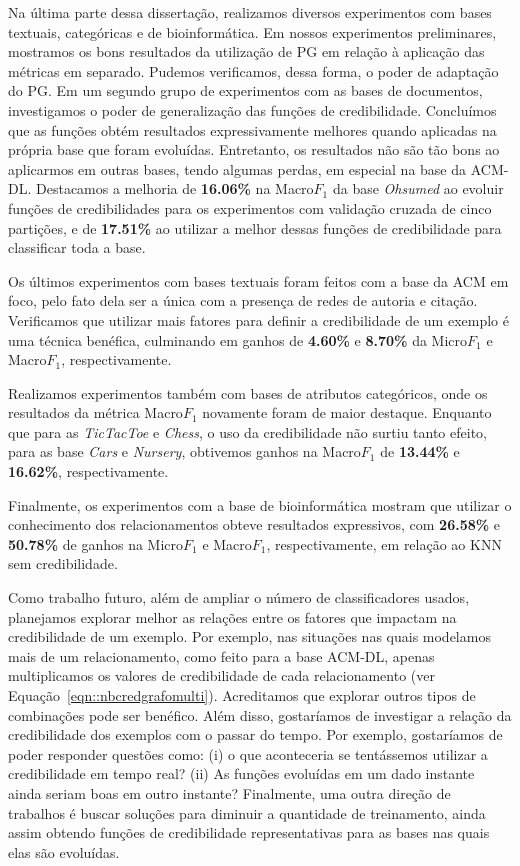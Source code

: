 Na última parte dessa dissertação, realizamos diversos experimentos com bases textuais, categóricas e de bioinformática. Em nossos experimentos preliminares, mostramos os bons resultados da utilização de \textsc{PG} em relação à aplicação das métricas em separado. Pudemos verificamos, dessa forma, o poder de adaptação do \textsc{PG}.
Em um segundo grupo de experimentos com as bases de documentos, investigamos o poder de generalização das funções de credibilidade. Concluímos que as funções obtém resultados expressivamente melhores quando aplicadas na própria base que foram evoluídas. Entretanto, os resultados não são tão bons ao aplicarmos em outras bases, tendo algumas perdas, em especial na base da \textsc{ACM-DL}.
Destacamos a melhoria de \textbf{16.06\%} na Macro$F_1$ da base \textit{Ohsumed} ao evoluir funções de credibilidades para os experimentos com validação cruzada de cinco partições, e de
\textbf{17.51\%} ao utilizar a melhor dessas funções de credibilidade para classificar toda a base.

Os últimos experimentos com bases textuais foram feitos com a base da \textsc{ACM} em foco, pelo fato dela ser a única com a presença de redes de autoria e citação. Verificamos que utilizar mais fatores para definir a credibilidade de um exemplo é uma técnica benéfica, culminando em ganhos de \textbf{4.60\%} e \textbf{8.70\%} da Micro$F_1$ e Macro$F_1$, respectivamente.

Realizamos experimentos também com bases de atributos categóricos, onde os resultados da métrica Macro$F_1$ novamente foram de maior destaque. Enquanto que para as \textit{TicTacToe} e \textit{Chess}, o uso da credibilidade não surtiu tanto efeito, para as base \textit{Cars} e \textit{Nursery}, obtivemos ganhos na Macro$F_1$ de \textbf{13.44\%} e \textbf{16.62\%}, respectivamente.

Finalmente, os experimentos com a base de bioinformática mostram que utilizar o conhecimento dos relacionamentos obteve resultados expressivos, com \textbf{26.58\%} e \textbf{50.78\%} de ganhos na Micro$F_1$ e Macro$F_1$,
respectivamente, 
em relação ao \textsc{KNN} sem credibilidade.

Como trabalho futuro, além de ampliar o número de classificadores usados, planejamos explorar melhor as relações entre os fatores que impactam na credibilidade de um exemplo. Por exemplo, nas situações nas quais modelamos mais de um relacionamento, como feito para a base \textsc{ACM-DL}, apenas multiplicamos os valores de credibilidade de cada relacionamento (ver Equação~\ref{eqn::nbcredgrafomulti}). Acreditamos que explorar outros tipos de combinações pode ser benéfico.
Além disso, gostaríamos de investigar a relação da credibilidade dos exemplos com o passar do tempo. Por exemplo, gostaríamos de poder responder questões como: (i) o que aconteceria se tentássemos utilizar a credibilidade em tempo real? (ii) As funções evoluídas em um dado instante ainda seriam boas em outro instante? Finalmente, uma outra direção de trabalhos é buscar soluções para diminuir a quantidade de treinamento, ainda assim obtendo funções de credibilidade representativas para as bases nas quais elas são evoluídas.



